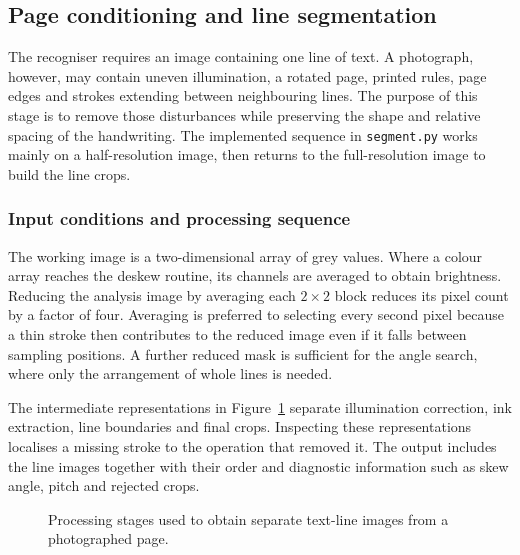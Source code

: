 \subsection{Page conditioning and line segmentation}
\label{sec:des-seg}
The recogniser requires an image containing one line of text. A photograph, however, may contain uneven illumination, a rotated page, printed rules, page edges and strokes extending between neighbouring lines. The purpose of this stage is to remove those disturbances while preserving the shape and relative spacing of the handwriting. The implemented sequence in \texttt{segment.py} works mainly on a half-resolution image, then returns to the full-resolution image to build the line crops.~\cite[segment.py]{braunepipeline2026}


\subsubsection{Input conditions and processing sequence}
The working image is a two-dimensional array of grey values. Where a colour array reaches the deskew routine, its channels are averaged to obtain brightness. Reducing the analysis image by averaging each $2\times2$ block reduces its pixel count by a factor of four. Averaging is preferred to selecting every second pixel because a thin stroke then contributes to the reduced image even if it falls between sampling positions. A further reduced mask is sufficient for the angle search, where only the arrangement of whole lines is needed.~\cite[segment.py]{braunepipeline2026}


The intermediate representations in Figure~\ref{fig:des-seg-stages} separate illumination correction, ink extraction, line boundaries and final crops. Inspecting these representations localises a missing stroke to the operation that removed it. The output includes the line images together with their order and diagnostic information such as skew angle, pitch and rejected crops.~\cite[segment.py]{braunepipeline2026}


\begin{figure}[!htbp]\centering
{}
\caption{Processing stages used to obtain separate text-line images from a photographed page.~\cite{brauneevidence2026,braunepipeline2026}}
\label{fig:des-seg-stages}
\end{figure}

